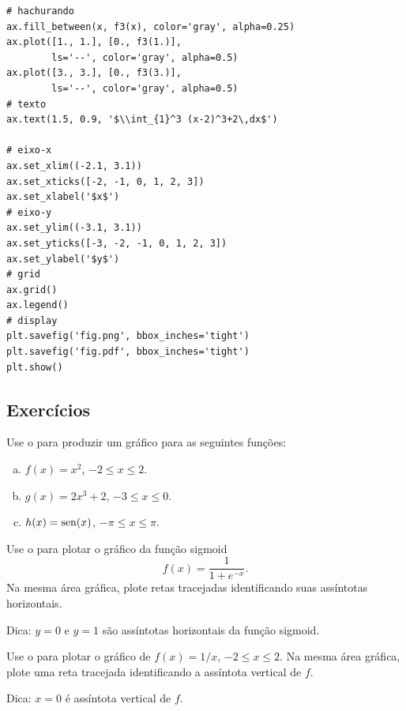 \begin{ex}
\begin{lstlisting}
# hachurando
ax.fill_between(x, f3(x), color='gray', alpha=0.25)
ax.plot([1., 1.], [0., f3(1.)],
        ls='--', color='gray', alpha=0.5)
ax.plot([3., 3.], [0., f3(3.)],
        ls='--', color='gray', alpha=0.5)
# texto
ax.text(1.5, 0.9, '$\\int_{1}^3 (x-2)^3+2\,dx$')

# eixo-x
ax.set_xlim((-2.1, 3.1))
ax.set_xticks([-2, -1, 0, 1, 2, 3])
ax.set_xlabel('$x$')
# eixo-y
ax.set_ylim((-3.1, 3.1))
ax.set_yticks([-3, -2, -1, 0, 1, 2, 3])
ax.set_ylabel('$y$')
# grid
ax.grid()
ax.legend()
# display
plt.savefig('fig.png', bbox_inches='tight')
plt.savefig('fig.pdf', bbox_inches='tight')
plt.show()
\end{lstlisting}

\end{ex}

\subsection{Exercícios}

\begin{exer}
  Use o {\matplotlib} para produzir um gráfico para as seguintes funções:
  \begin{enumerate}[a)]
  \item $\displaystyle f(x) = x^2$, $-2 \leq x \leq 2$.
  \item $\displaystyle g(x) = 2x^3+2$, $-3 \leq x \leq 0$.
  \item $\displaystyle h(x) = \operatorname{sen}(x)$, $-\pi \leq x \leq \pi$.
  \end{enumerate}
\end{exer}

\begin{exer}
  Use o {\matplotlib} para plotar o gráfico da função sigmoid
  \begin{equation}
    f(x) = \frac{1}{1 + e^{-x}}.
  \end{equation}
  Na mesma área gráfica, plote retas tracejadas identificando suas assíntotas horizontais.
\end{exer}
\begin{resp}
  Dica: $y = 0$ e $y=1$ são assíntotas horizontais da função sigmoid.
\end{resp}

\begin{exer}
  Use o {\matplotlib} para plotar o gráfico de $f(x) = 1/x$, $-2 \leq x \leq 2$. Na mesma área gráfica, plote uma reta tracejada identificando a assíntota vertical de $f$.
\end{exer}
\begin{resp}
  Dica: $x = 0$ é assíntota vertical de $f$.
\end{resp}

